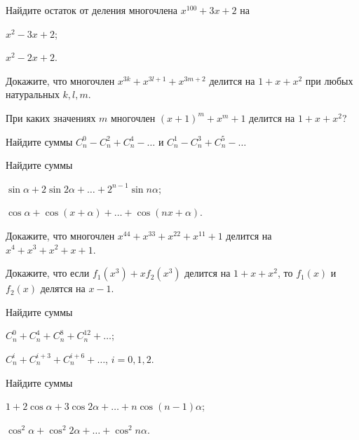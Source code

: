 \documentclass[a4paper, 12pt, num=22]{listok}
\begin{document}
\begin{problem}
	Найдите остаток от деления многочлена $x^{100} + 3x + 2$ на
	\begin{multienum}{2}
		\item $x^2 - 3x + 2$;
		\item $x^2 - 2x + 2$.
	\end{multienum}
\end{problem}
\begin{problem}
	Докажите, что многочлен $x^{3k} + x^{3l+1} + x^{3m+2}$ делится на $1 + x + x^2$ при любых натуральных $k, l, m$.
\end{problem}
\begin{problem}
	При каких значениях $m$ многочлен ${(x + 1)}^m + x^m + 1$ делится на $1 + x + x^2$?
\end{problem}
\begin{problem}
	Найдите суммы $C_n^0 - C_n^2 + C_n^4 - \ldots$ и $C_n^1 - C_n^3 + C_n^5 - \ldots$
\end{problem}
\begin{problem}
	Найдите суммы
	\begin{multienum}{2}
		\item $\sin \alpha + 2 \sin{2\alpha} + \ldots + 2^{n-1} \sin{n\alpha}$;
		\item $\cos \alpha + \cos{(x + \alpha)} + \ldots + \cos{(nx + \alpha)}$.
	\end{multienum}
\end{problem}
\begin{problem}
	Докажите, что многочлен $x^{44} + x^{33} + x^{22} + x^{11} + 1$ делится на $x^4 + x^3 + x^2 + x + 1$.
\end{problem}
\begin{problem}
	Докажите, что если $f_1(x^3) + x f_2(x^3)$ делится на $1 + x + x^2$, то $f_1(x)$ и $f_2(x)$ делятся на $x - 1$.
\end{problem}
\begin{problem}
	Найдите суммы
	\begin{multienum}{2}
		\item $C_n^0 + C_n^4 + C_n^8 + C_n^{12} + \ldots$;
		\item $C_n^i + C_n^{i + 3} + C_n^{i + 6} + \ldots$, $i = 0, 1, 2$.
	\end{multienum}
\end{problem}
\begin{problem}
	Найдите суммы
	\begin{multienum}{2}
		\item $1 + 2 \cos \alpha + 3 \cos{2\alpha} + \ldots + n \cos{(n−1)\alpha}$;
		\item $\cos^2 \alpha + \cos^2 {2\alpha} + \ldots + \cos^2 {n\alpha}$.
	\end{multienum}
\end{problem}
\end{document}
